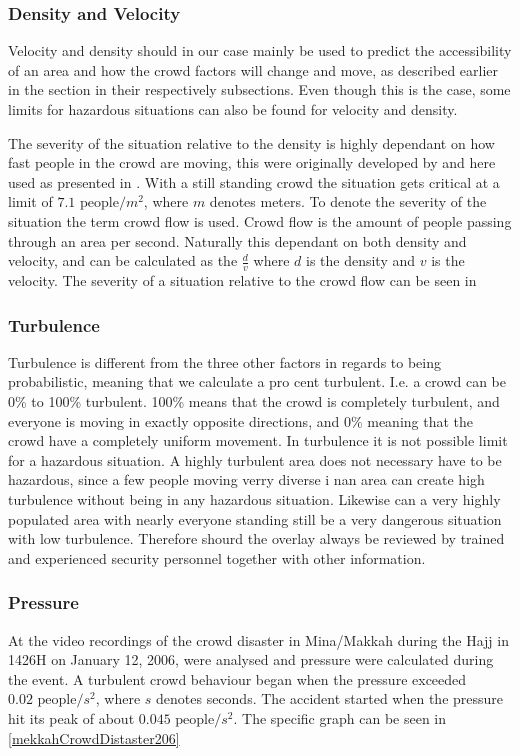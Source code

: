 \subsubsection{Density and Velocity}
Velocity and density should in our case mainly be used to predict the accessibility of an area and how the crowd factors will change and move, as described earlier in the section in their respectively subsections. Even though this is the case, some limits for hazardous situations can also be found for velocity and density.

The severity of the situation relative to the density is highly dependant on how fast people in the crowd are moving, this were originally developed by \citet{crowdDistasters} and here used as presented in \citet{wirz2013probing}. With a still standing crowd the situation gets critical at a limit of $7.1 \text{ people} / m^2$, where $m$ denotes meters. To denote the severity of the situation the term crowd flow is used. Crowd flow is the amount of people passing through an area per second. Naturally this dependant on both density and velocity, and can be calculated as the $\frac{d}{v}$ where $d$ is the density and $v$ is the velocity. The severity of a situation relative to the crowd flow can be seen in 

\subsubsection{Turbulence}
Turbulence is different from the three other factors in regards to being probabilistic, meaning that we calculate a pro cent turbulent. I.e. a crowd can be 0\% to 100\% turbulent. 100\% means that the crowd is completely turbulent, and everyone is moving in exactly opposite directions, and 0\% meaning that the crowd have a completely uniform movement. In turbulence it is not possible limit for a hazardous situation. A highly turbulent area does not necessary have to be hazardous, since a few people moving verry diverse i nan area can create high turbulence without being in any hazardous situation. Likewise can a very highly populated area with nearly everyone standing still be a very dangerous situation with low turbulence. Therefore shourd the overlay always be reviewed by trained and experienced security personnel together with other information. 

\subsubsection{Pressure}
At \citet{empircalstudy} the video recordings of the crowd disaster in Mina/Makkah during the Hajj in 1426H on January 12, 2006, were analysed and pressure were calculated during the event. A turbulent crowd behaviour began when the pressure exceeded $0.02 \text{ people} / s^2$, where $s$ denotes seconds. The accident started when the pressure hit its peak of about $0.045 \text{ people} / s^2$. The specific graph can be seen in \cref{mekkahCrowdDistaster206}

